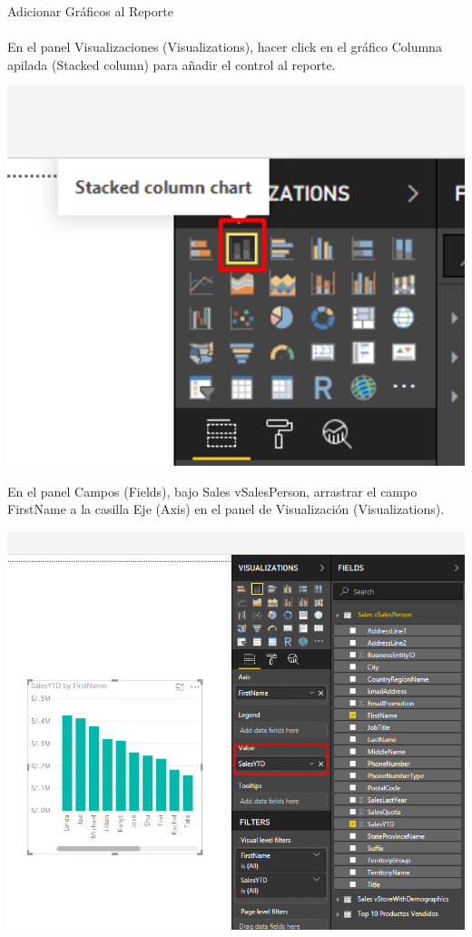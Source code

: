 \documentclass[12pt,letterpaper]{article}
\begin{document}
Adicionar Gráficos al Reporte\\\\
En el panel Visualizaciones (Visualizations), hacer click en el gráfico Columna apilada (Stacked column) para añadir el control al reporte.
\begin{center}
    \includegraphics[width=16cm]{img/18.png}  
\end{center}
En el panel Campos (Fields), bajo Sales vSalesPerson, arrastrar el campo FirstName a la casilla Eje (Axis) en el panel de Visualización (Visualizations).
\begin{center}
    \includegraphics[width=16cm]{img/20.png}  
\end{center}
\end{document}
